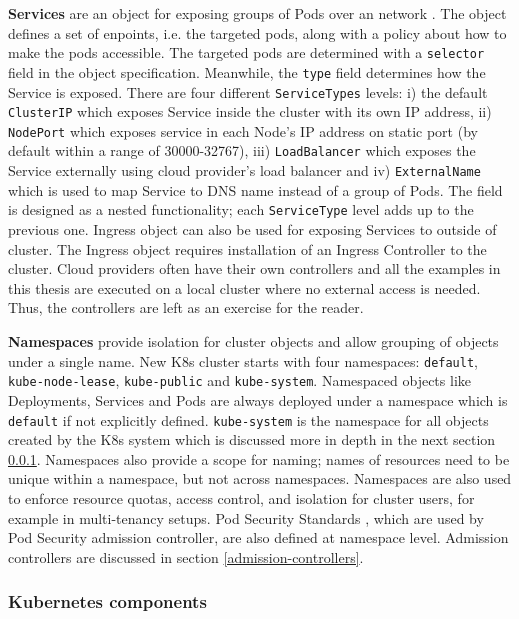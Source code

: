 \documentclass[english, 12pt, a4paper, sci, utf8, a-2b, online]{aaltothesis}
\begin{document}
\textbf{Services} are an object for exposing groups of Pods over an network \cite{k8s-docs-services}. The object defines a set of enpoints, i.e. the targeted pods, along with a policy about how to make the pods accessible. The targeted pods are determined with a \texttt{selector} field in the object specification. Meanwhile, the \texttt{type} field determines how the Service is exposed. There are four different \texttt{ServiceTypes} levels: i) the default \texttt{ClusterIP} which exposes Service inside the cluster with its own IP address, ii) \texttt{NodePort} which exposes service in each Node's IP address on static port (by default within a range of 30000-32767), iii) \texttt{LoadBalancer} which exposes the Service externally using cloud provider's load balancer and iv) \texttt{ExternalName} which is used to map Service to DNS name instead of a group of Pods. The field is designed as a nested functionality; each \texttt{ServiceType} level adds up to the previous one. Ingress object can also be used for exposing Services to outside of cluster. The Ingress object requires installation of an Ingress Controller to the cluster. Cloud providers often have their own controllers and all the examples in this thesis are executed on a local cluster where no external access is needed. Thus, the controllers are left as an exercise for the reader.

\textbf{Namespaces} provide isolation for cluster objects and allow grouping of objects under a single name. New K8s cluster starts with four namespaces: \texttt{default}, \texttt{kube-node-lease}, \texttt{kube-public} and \texttt{kube-system}. Namespaced objects like Deployments, Services and Pods are always deployed under a namespace which is \texttt{default} if not explicitly defined. \texttt{kube-system} is the namespace for all objects created by the K8s system which is discussed more in depth in the next section \ref{control-plane}. Namespaces also provide a scope for naming; names of resources need to be unique within a namespace, but not across namespaces. Namespaces are also used to enforce resource quotas, access control, and isolation for cluster users, for example in multi-tenancy setups. Pod Security Standards \cite{k8s-docs-pss}, which are used by Pod Security admission controller, are also defined at namespace level. Admission controllers are discussed in section \ref{admission-controllers}.

\subsubsection{Kubernetes components} \label{control-plane}
\end{document}
